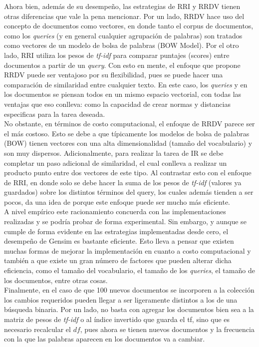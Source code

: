 Ahora bien, además de su desempeño, las estrategias de RRI y RRDV tienen otras diferencias que vale la pena mencionar. Por un lado, RRDV hace uso del concepto de documentos como vectores, en donde tanto el corpus de documentos, como los \textit{queries} (y en general cualquier agrupación de palabras) son tratados como vectores de un modelo de bolsa de palabras (BOW Model). Por el otro lado, RRI utiliza los pesos de \textit{tf-idf} para comparar puntajes (scores) entre documentos a partir de un \textit{query}. Con esto en mente, el enfoque que propone RRDV puede ser ventajoso por su flexibilidad, pues se puede hacer una comparación de similaridad entre cualquier texto. En este caso, los \textit{queries} y en los documentos se piensan todos en un mismo espacio vectorial, con todas las ventajas que eso conlleva: como la capacidad de crear normas y distancias especificas para la tarea deseada. \\

No obstante, en términos de costo computacional, el enfoque de RRDV parece ser el más costoso. Esto se debe a que típicamente los modelos de bolsa de palabras (BOW) tienen vectores con una alta dimensionalidad (tamaño del vocabulario) y son muy dispersos. Adicionalmente, para realizar la tarea de IR se debe completar un paso adicional de similaridad, el cual conlleva a realizar un producto punto entre dos vectores de este tipo. Al contrastar esto con el enfoque de RRI, en donde solo se debe hacer la suma de los pesos de \textit{tf-idf} (valores ya guardados) sobre los distintos términos del query, los cuales además tienden a ser pocos, da una idea de porque este enfoque puede ser mucho más eficiente. \\

A nivel empírico este racionamiento concuerda con las implementaciones realizadas y se podría probar de forma experimental. Sin embargo, y aunque se cumple de forma evidente en las estrategias implementadas desde cero, el desempeño de Gensim es bastante eficiente. Esto lleva a pensar que existen muchas formas de mejorar la implementación en cuanto a costo computacional y también a que existe un gran número de factores que pueden alterar dicha eficiencia, como el tamaño del vocabulario, el tamaño de los \textit{queries}, el tamaño de los documentos, entre otras cosas. \\

Finalmente, en el caso de que 100 nuevos documentos se incorporen a la colección los cambios requeridos pueden llegar a ser ligeramente distintos a los de una búsqueda binaria. Por un lado, no basta con agregar los documentos bien sea a la matriz de pesos de \textit{tf-idf} o al índice invertido que guarda el tf, sino que es necesario recalcular el $df$, pues ahora se tienen nuevos documentos y la frecuencia con la que las palabras aparecen en los documentos va a cambiar. 


